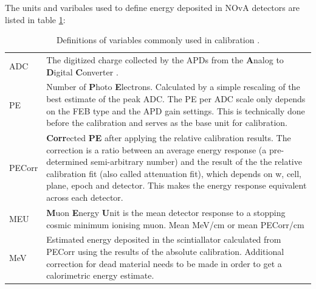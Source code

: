 \documentclass[12pt,a4paper]{article}
\begin{document}

The units and varibales used to define energy deposited in NOvA detectors are listed in table \ref{tabCalibrationVars}:
\begin{table}[!ht]
\centering
\def\arraystretch{1.4}
\begin{tabular}{m{} m{}}
ADC & The digitized charge collected by the APDs from the \textbf{A}nalog to \textbf{D}igital \textbf{C}onverter \cite{NOVA-doc-13518}.\\
PE & Number of \textbf{P}hoto \textbf{E}lectrons. Calculated by a simple rescaling of the best estimate of the peak ADC. The PE per ADC scale only depends on the FEB type and the APD gain settings. This is technically done before the calibration and serves as the base unit for calibration.\\
PECorr & \textbf{Corr}ected \textbf{PE} after applying the relative calibration results. The correction is a ratio between an average energy response (a pre-determined semi-arbitrary number) and the result of the the relative calibration fit (also called attenuation fit), which depends on w, cell, plane, epoch and detector. This makes the energy response equivalent across each detector.\\
MEU & \textbf{M}uon \textbf{E}nergy \textbf{U}nit is the mean detector response to a stopping cosmic minimum ionising muon.  Mean MeV/cm or mean PECorr/cm\\
MeV & Estimated energy deposited in the scintiallator calculated from PECorr using the results of the absolute calibration. Additional correction for dead material needs to be made in order to get a calorimetric energy estimate.
\end{tabular}
\caption{Definitions of variables commonly used in calibration \cite{NOVA-doc-13579,NOVA-doc-7410}.}
\label{tabCalibrationVars}
\end{table}
\end{document}
